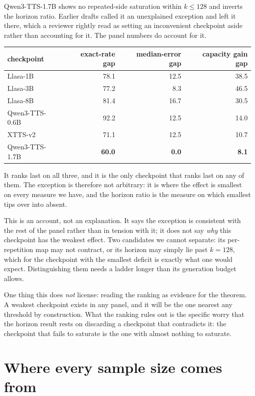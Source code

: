 \documentclass[11pt]{article}
\begin{document}
Qwen3-TTS-1.7B shows no repeated-side saturation within $k\le128$ and inverts the
horizon ratio. Earlier drafts called it an unexplained exception and left it
there, which a reviewer rightly read as setting an inconvenient checkpoint aside
rather than accounting for it. The panel numbers do account for it.

\begin{center}
\begin{tabular}{lrrr}
\toprule
checkpoint & exact-rate gap & median-error gap & capacity gain gap \\
\midrule
Llasa-1B        & 78.1 & 12.5 & 38.5 \\
Llasa-3B        & 77.2 &  8.3 & 46.5 \\
Llasa-8B        & 81.4 & 16.7 & 30.5 \\
Qwen3-TTS-0.6B  & 92.2 & 12.5 & 14.0 \\
XTTS-v2         & 71.1 & 12.5 & 10.7 \\
Qwen3-TTS-1.7B  & \textbf{60.0} & \textbf{0.0} & \textbf{8.1} \\
\bottomrule
\end{tabular}
\end{center}

\noindent It ranks last on all three, and it is the only checkpoint that ranks
last on any of them. The exception is therefore not arbitrary: it is where the
effect is smallest on every measure we have, and the horizon ratio is the measure
on which smallest tips over into absent.

This is an account, not an explanation. It says the exception is consistent with
the rest of the panel rather than in tension with it; it does not say \emph{why}
this checkpoint has the weakest effect. Two candidates we cannot separate: its
per-repetition map may not contract, or its horizon may simply lie past $k=128$,
which for the checkpoint with the smallest deficit is exactly what one would
expect. Distinguishing them needs a ladder longer than its generation budget
allows.

One thing this does \emph{not} license: reading the ranking as evidence for the
theorem. A weakest checkpoint exists in any panel, and it will be the one nearest
any threshold by construction. What the ranking rules out is the specific worry
that the horizon result rests on discarding a checkpoint that contradicts it:
the checkpoint that fails to saturate is the one with almost nothing to saturate.


\section{Where every sample size comes from}
\end{document}
